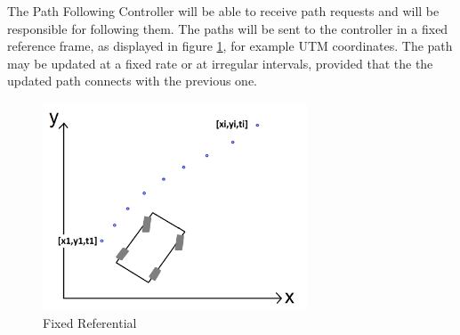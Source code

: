 \documentclass{article}
\begin{document}
The Path Following Controller will be able to receive path requests and will be responsible for following them. The paths will be sent to the controller in a fixed reference frame, as displayed in figure \ref{fig:fixedReferential}, for example UTM coordinates. The path may be updated at a fixed rate or at irregular intervals, provided that the the updated path connects with the previous one.


\begin{figure}[h!]
\centering
\includegraphics[width=0.7\textwidth]{fixedReferential}
\caption{Fixed Referential}
\label{fig:fixedReferential}
\end{figure} 



%	
%
% 
\end{document}
